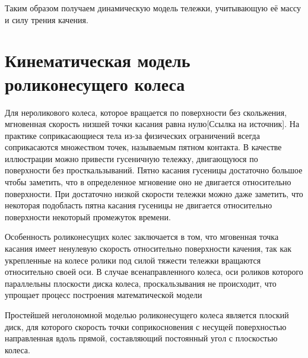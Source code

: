 \documentclass[oneside,final,14pt]{extreport}
\begin{document}
Таким образом получаем динамическую модель тележки, учитывающую её массу и силу трения качения. 

\iffalse
В работе ref более детально рассматривается динамическая модель тележки на N роликонесущих колесах.  Модель тележки строится исходя из предположения о том, что модель роликонесущего колеса — твердый диск, скорость наинизшей точки которого перпендикулярна направлению оси ролика в этой точке. Кроме того, рассмотрен критерий управляемости такой модели, из которого следует ряд ограничений на его конструкцию. Например если сумма угла оси ролика и угла поворота колеса всех роликонесущих колес равна, то такая модель не может двигаться по произвольной трактории. Если же эти углы у двух колес совпадают, то пару колес можно принять за одно виртуальное колесо с радиус вектором $r_{ij} = r_{i} - r_{j}$ в локальной системе координат и моментом $T_{ij} = T_{i} + T_{j}$.
\fi
\chapter{Кинематическая модель роликонесущего колеса} 
Для нероликового колеса, которое вращается по поверхности без скольжения, мгновенная скорость низшей точки касания равна нулю[Ссылка на источник]. На практике соприкасающиеся тела из-за физических ограничений всегда соприкасаются множеством точек, называемым пятном контакта. В качестве иллюстрации можно привести гусеничную тележку, двигающуюся по поверхности без просткальзываний. Пятно касания гусеницы достаточно большое чтобы заметить, что в определенное мгновение оно не двигается относительно поверхности. При достаточно низкой скорости тележки можно даже заметить, что некоторая подобласть пятна касания гусеницы не двигается относительно поверхности некоторый промежуток времени. 

Особенность роликонесущих колес заключается в том, что мговенная точка касания имеет ненулевую скорость относительно поверхности качения, так как укрепленные на колесе ролики под силой тяжести тележки вращаются относительно своей оси. В случае всенаправленного колеса, оси роликов которого параллельны плоскости диска колеса, проскальзывания не происходит, что упрощает процесс построения математической модели

 Простейшей неголономной моделью роликонесущего колеса является плоский диск, для которого скорость точки соприкосновения с несущей поверхностью направленная вдоль прямой, составляющий постоянный угол с плоскостью колеса.

\begin{figure}[H]
\end{figure}
\end{document}
